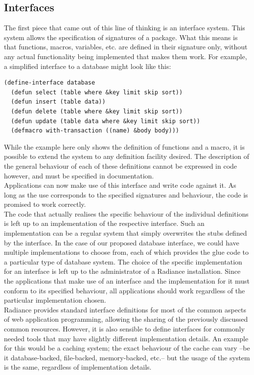 \documentclass{sig-alternate}
\begin{document}
\subsection{Interfaces}
The first piece that came out of this line of thinking is an interface system. This system allows the specification of signatures of a package. What this means is that functions, macros, variables, etc. are defined in their signature only, without any actual functionality being implemented that makes them work. For example, a simplified interface to a database might look like this:

\begin{verbatim}
(define-interface database
  (defun select (table where &key limit skip sort))
  (defun insert (table data))
  (defun delete (table where &key limit skip sort))
  (defun update (table data where &key limit skip sort))
  (defmacro with-transaction ((name) &body body)))
\end{verbatim}

While the example here only shows the definition of functions and a macro, it is possible to extend the system to any definition facility desired. The description of the general behaviour of each of these definitions cannot be expressed in code however, and must be specified in documentation. \\

Applications can now make use of this interface and write code against it. As long as the use corresponds to the specified signatures and behaviour, the code is promised to work correctly. \\

The code that actually realises the specific behaviour of the individual definitions is left up to an implementation of the respective interface. Such an implementation can be a regular system that simply overwrites the stubs defined by the interface. In the case of our proposed database interface, we could have multiple implementations to choose from, each of which provides the glue code to a particular type of database system. The choice of the specific implementation for an interface is left up to the administrator of a Radiance installation. Since the applications that make use of an interface and the implementation for it must conform to its specified behaviour, all applications should work regardless of the particular implementation chosen. \\

Radiance provides standard interface definitions for most of the common aspects of web application programming, allowing the sharing of the previously discussed common resources. However, it is also sensible to define interfaces for commonly needed tools that may have slightly different implementation details. An example for this would be a caching system; the exact behaviour of the cache can vary --be it database-backed, file-backed, memory-backed, etc.-- but the usage of the system is the same, regardless of implementation details. \\
\end{document}
